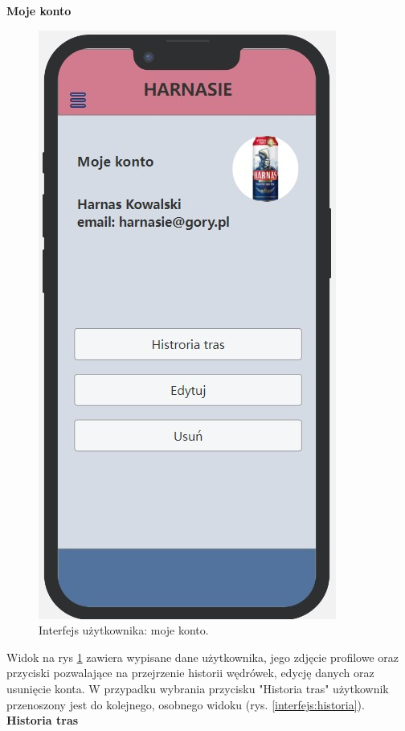     \textbf{Moje konto} 
    \begin{figure}[H]
        \centering
        \includegraphics[scale=0.5]{img/interfejsy/if_konto.jpg}
        \caption{Interfejs użytkownika: moje konto.}
        \label{interfejs:konto}
    \end{figure}
    Widok na rys \ref{interfejs:konto} zawiera wypisane dane użytkownika, jego zdjęcie profilowe oraz przyciski pozwalające na przejrzenie historii wędrówek, edycję danych oraz usunięcie konta. W przypadku wybrania przycisku "Historia tras" użytkownik przenoszony jest do kolejnego, osobnego widoku (rys. \ref{interfejs:historia}). \\
    \textbf{Historia tras}
